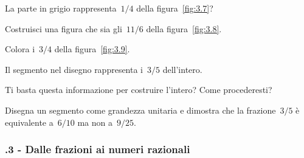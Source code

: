  \begin{esercizio}
 \label{ese:3.17}
La parte in grigio rappresenta~$1/4$ della figura~\ref{fig:3.7}?
\end{esercizio}

\begin{esercizio}
\label{ese:3.18}
 Costruisci una figura che sia gli~$11/6$ della figura~\ref{fig:3.8}.
\end{esercizio}

\begin{esercizio}
\label{ese:3.19}
Colora i~$3/4$ della figura~\ref{fig:3.9}.
\end{esercizio}

\begin{esercizio}
 \label{ese:3.20}
Il segmento nel disegno rappresenta i~$3/5$ dell'intero.
 \begin{center}
 
 \end{center}
Ti basta questa informazione per costruire l'intero? Come procederesti?
\end{esercizio}

\begin{esercizio}
 \label{ese:3.21}
Disegna un segmento come grandezza unitaria e dimostra che la frazione~$3/5$ è equivalente a~$6/10$ ma non a~$9/25$.
% 
\end{esercizio}


\subsubsection*{\thechapter.3 - Dalle frazioni ai numeri razionali}

%


